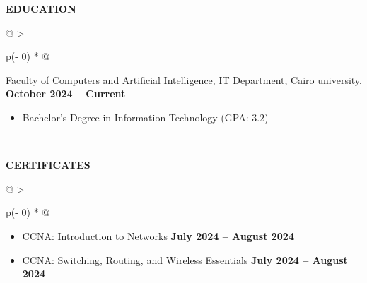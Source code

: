 \documentclass[a4paper]{article}
\begin{document}
\vspace{-12pt}

\textbf{EDUCATION}
\vspace{-8pt}
\begin{longtable}[]{@{}
    >{\raggedright\arraybackslash}p{(\columnwidth - 0\tabcolsep) * }@{}}
\toprule\noalign{}
\vspace{0pt}
\begin{minipage}[t]{\linewidth}\raggedright
Faculty of Computers and Artificial Intelligence, IT Department, Cairo
    university.
\hspace{10em}\textbf{October 2024 -- Current}

    \begin{itemize}
        \item
          Bachelor's Degree in Information Technology (GPA: 3.2)
        \end{itemize}
\end{minipage} \\
\end{longtable}


\textbf{CERTIFICATES}
\vspace{-8pt}
\begin{longtable}[]{@{}
    >{\raggedright\arraybackslash}p{(\columnwidth - 0\tabcolsep) * }@{}}
\toprule\noalign{}
\vspace{0pt}
\begin{minipage}[t]{\linewidth}\raggedright
    \begin{itemize}
        \item
            CCNA: Introduction to Networks
            \hspace{28em}\textbf{July 2024 -- August 2024}
        \item
            CCNA: Switching, Routing, and Wireless Essentials
            \hspace{20.3em}\textbf{July 2024 -- August 2024}
        \end{itemize}
\end{minipage} \\
\end{longtable}
\end{document}
